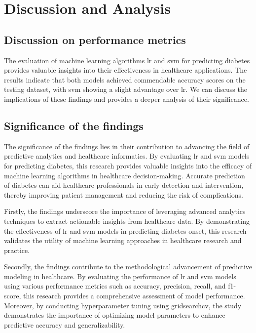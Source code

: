 \chapter{Discussion and Analysis}
\label{ch:evaluation}

\section{Discussion on performance metrics}%
The evaluation of machine learning algorithms lr and svm for predicting diabetes provides valuable insights into their effectiveness in healthcare applications. The results indicate that both models achieved commendable accuracy scores on the testing dataset, with svm showing a slight advantage over lr. We can discuss the implications of these findings and provides a deeper analysis of their significance.

\section{Significance of the findings}
The significance of the findings lies in their contribution to advancing the field of predictive analytics and healthcare informatics. By evaluating lr and svm models for predicting diabetes, this research provides valuable insights into the efficacy of machine learning algorithms in healthcare decision-making. Accurate prediction of diabetes can aid healthcare professionals in early detection and intervention, thereby improving patient management and reducing the risk of complications.

 Firstly, the findings underscore the importance of leveraging advanced analytics techniques to extract actionable insights from healthcare data. By demonstrating the effectiveness of lr and svm models in predicting diabetes onset, this research validates the utility of machine learning approaches in healthcare research and practice.

 Secondly, the findings contribute to the methodological advancement of predictive modeling in healthcare. By evaluating the performance of lr and svm models using various performance metrics such as accuracy, precision, recall, and f1-score, this research provides a comprehensive assessment of model performance. Moreover, by conducting hyperparameter tuning using gridsearchcv, the study demonstrates the importance of optimizing model parameters to enhance predictive accuracy and generalizability.


